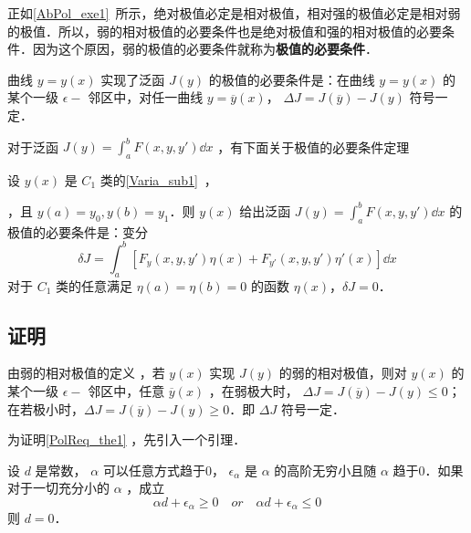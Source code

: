 
正如\autoref{AbPol_exe1}~所示，绝对极值必定是相对极值，相对强的极值必定是相对弱的极值．所以，弱的相对极值的必要条件也是绝对极值和强的相对极值的必要条件．因为这个原因，弱的极值的必要条件就称为\textbf{极值的必要条件}．

曲线 $y=y(x)$ 实现了泛函 $J(y)$ 的极值的必要条件是：在曲线 $y=y(x)$ 的某个一级 $\epsilon-$ 邻区中，对任一曲线 $y=\overline{y}(x)$， $\Delta J=J(\overline{y})-J(y)$ 符号一定．

对于泛函 $J(y)=\int_a^bF(x,y,y')\dd x$ ，有下面关于极值的必要条件定理
\begin{theorem}{}\label{PolReq_the1}
设 $y(x)$ 是 $C_1$ 类的\autoref{Varia_sub1}~，
\end{theorem}，且 $y(a)=y_0,y(b)=y_1$．则 $y(x)$ 给出泛函 $J(y)=\int_a^bF(x,y,y')\dd x$ 的极值的必要条件是：变分
\begin{equation}
\delta J=\int_a^b[F_y(x,y,y')\eta(x)+F_{y'}(x,y,y')\eta'(x)]\dd x
\end{equation}
对于 $C_1$ 类的任意满足 $\eta(a)=\eta(b)=0$ 的函数 $\eta(x)$，$\delta J=0$．
\subsection{证明}
由弱的相对极值的定义 ，若 $y(x)$ 实现 $J(y)$ 的弱的相对极值，则对 $y(x)$ 的某个一级 $\epsilon-$ 邻区中，任意 $\overline{y}(x)$ ，在弱极大时， $\Delta J=J(\overline{y})-J(y)\leq 0$；在若极小时，$\Delta J=J(\overline{y})-J(y)\geq 0$．即 $\Delta J$ 符号一定．

为证明\autoref{PolReq_the1} ，先引入一个引理．
\begin{lemma}{}
设 $d$ 是常数， $\alpha$ 可以任意方式趋于0， $\epsilon_\alpha$ 是 $\alpha$ 的高阶无穷小且随 $\alpha$ 趋于0．如果对于一切充分小的 $\alpha$ ，成立 
\begin{equation}
\alpha d+\epsilon_\alpha\geq0\quad or\quad\alpha d+\epsilon_\alpha\leq0
\end{equation}
则 $d=0$．
\end{lemma}